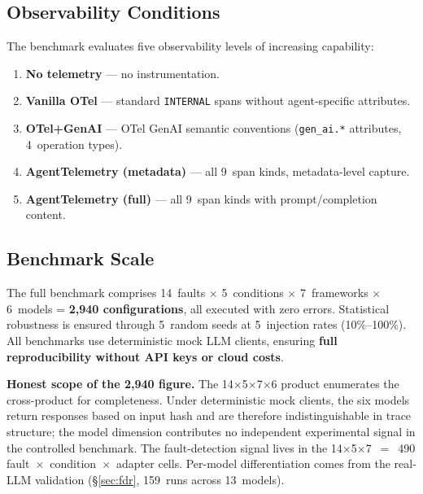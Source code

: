 \documentclass[sigconf,screen]{acmart}
\begin{document}
\subsection{Observability Conditions}

The benchmark evaluates five observability levels of increasing
capability:
\begin{enumerate}[leftmargin=*,nosep]
\item \textbf{No telemetry} --- no instrumentation.
\item \textbf{Vanilla OTel} --- standard \texttt{INTERNAL} spans without
  agent-specific attributes.
\item \textbf{OTel+GenAI} --- OTel GenAI semantic conventions
  (\texttt{gen\_ai.*} attributes, 4~operation types).
\item \textbf{AgentTelemetry (metadata)} --- all 9~span kinds,
  metadata-level capture.
\item \textbf{AgentTelemetry (full)} --- all 9~span kinds with
  prompt/completion content.
\end{enumerate}

\subsection{Benchmark Scale}

The full benchmark comprises 14~faults $\times$ 5~conditions $\times$
7~frameworks $\times$ 6~models = \textbf{2{,}940 configurations}, all
executed with zero errors.  Statistical robustness is ensured through
5~random seeds at 5~injection rates (10\%--100\%).  All benchmarks use
deterministic mock LLM clients, ensuring \textbf{full reproducibility
without API keys or cloud costs}.

\textbf{Honest scope of the 2{,}940 figure.}
The 14$\times$5$\times$7$\times$6 product enumerates the cross-product
for completeness.  Under deterministic mock clients, the six models
return responses based on input hash and are therefore
indistinguishable in trace structure; the model dimension contributes
no independent experimental signal in the controlled benchmark.  The
fault-detection signal lives in the 14$\times$5$\times$7~$=$~490
fault~$\times$~condition~$\times$~adapter cells.  Per-model
differentiation comes from the real-LLM validation
(\S\ref{sec:fdr}, 159~runs across 13~models).

\end{document}
